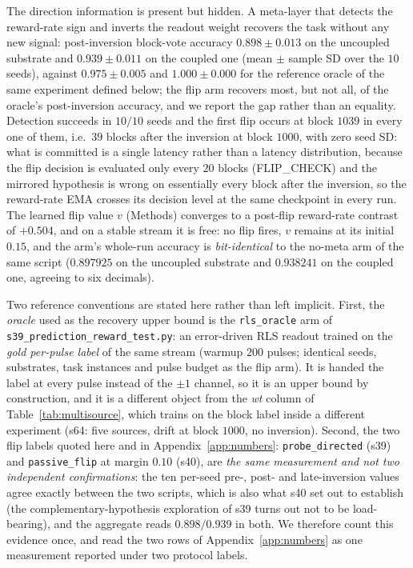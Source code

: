 \documentclass[preprint,12pt]{elsarticle}
\begin{document}
The direction information is present but hidden. A meta-layer that detects
the reward-rate sign and inverts the readout weight recovers the task without
any new signal: post-inversion block-vote accuracy $0.898\pm0.013$ on the
uncoupled substrate and $0.939\pm0.011$ on the coupled one (mean $\pm$ sample
SD over the $10$ seeds), against $0.975\pm0.005$ and $1.000\pm0.000$ for the
reference oracle of the same experiment defined below; the flip arm
recovers most, but not all, of the oracle's post-inversion accuracy, and we
report the gap rather than an equality. Detection succeeds in $10/10$ seeds and
the first flip occurs at block $1039$ in every one of them, i.e.\ $39$ blocks
after the inversion at block $1000$, with zero seed SD: what is committed is a
single latency rather than a latency distribution, because the flip decision
is evaluated only every $20$ blocks (FLIP\_CHECK) and the mirrored hypothesis
is wrong on essentially every block after the inversion, so the reward-rate
EMA crosses its decision level at the same checkpoint in every run. The
learned flip value $v$ (Methods) converges to a post-flip reward-rate contrast
of $+0.504$, and on a stable stream it is free: no flip fires, $v$ remains at
its initial $0.15$, and the arm's whole-run accuracy is \emph{bit-identical}
to the no-meta arm of the same script ($0.897925$ on the uncoupled substrate
and $0.938241$ on the coupled one, agreeing to six decimals).

Two reference conventions are stated here rather than left implicit. First,
the \emph{oracle} used as the recovery upper bound is the \texttt{rls\_oracle}
arm of \texttt{s39\_prediction\_reward\_test.py}: an error-driven RLS readout
trained on the \emph{gold per-pulse label} of the same stream (warmup $200$
pulses; identical seeds, substrates, task instances and pulse budget as the
flip arm). It is handed the label at every pulse instead of the $\pm1$
channel, so it is an upper bound by construction, and it is a different object
from the \textit{wt} column of Table~\ref{tab:multisource}, which trains on
the block label inside a different experiment (s64: five sources, drift at
block $1000$, no inversion). Second, the two flip labels quoted here and in
Appendix~\ref{app:numbers}: \texttt{probe\_directed} (s39) and
\texttt{passive\_flip} at margin $0.10$ (s40), are \emph{the same
measurement and not two independent confirmations}: the ten per-seed pre-,
post- and late-inversion values agree exactly between the two scripts, which
is also what s40 set out to establish (the complementary-hypothesis
exploration of s39 turns out not to be load-bearing), and the aggregate reads
$0.898/0.939$ in both. We therefore count this evidence once, and read the two
rows of Appendix~\ref{app:numbers} as one measurement reported under two
protocol labels.
\end{document}
